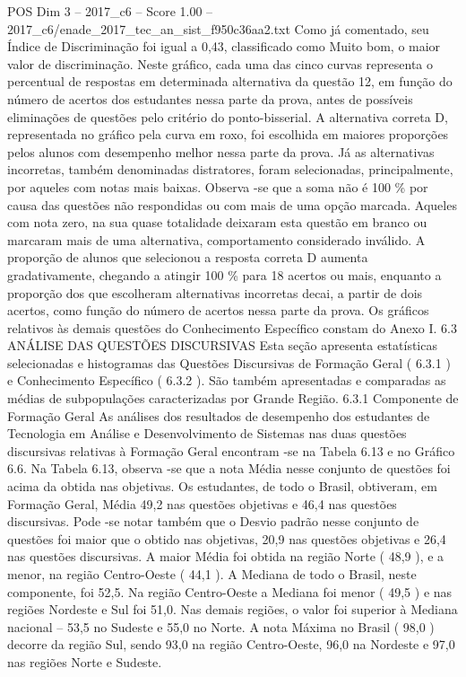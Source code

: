 \begin{textsample}{POS Dim 3 – 2017\_c6 – Score 1.00 – 2017\_c6/enade\_2017\_tec\_an\_sist\_f950c36aa2.txt}
Como já comentado, seu Índice de Discriminação foi igual a 0,43, classificado como Muito bom, o maior valor de discriminação.
Neste gráfico, cada uma das cinco curvas representa o percentual de respostas em determinada alternativa da questão 12, em função do número de acertos dos estudantes nessa parte da prova, antes de possíveis eliminações de questões pelo critério do ponto-bisserial.
A alternativa correta D, representada no gráfico pela curva em roxo, foi escolhida em maiores proporções pelos alunos com desempenho melhor nessa parte da prova.
Já as alternativas incorretas, também denominadas distratores, foram selecionadas, principalmente, por aqueles com notas mais baixas.
Observa -se que a soma não é 100 \% por causa das questões não respondidas ou com mais de uma opção marcada.
Aqueles com nota zero, na sua quase totalidade deixaram esta questão em branco ou marcaram mais de uma alternativa, comportamento considerado inválido.
A proporção de alunos que selecionou a resposta correta D aumenta gradativamente, chegando a atingir 100 \% para 18 acertos ou mais, enquanto a proporção dos que escolheram alternativas incorretas decai, a partir de dois acertos, como função do número de acertos nessa parte da prova.
Os gráficos relativos às demais questões do Conhecimento Específico constam do Anexo I. 6.3 ANÁLISE DAS QUESTÕES DISCURSIVAS Esta seção apresenta estatísticas selecionadas e histogramas das Questões Discursivas de Formação Geral ( 6.3.1 ) e Conhecimento Específico ( 6.3.2 ).
São também apresentadas e comparadas as médias de subpopulações caracterizadas por Grande Região. 6.3.1 Componente de Formação Geral As análises dos resultados de desempenho dos estudantes de Tecnologia em Análise e Desenvolvimento de Sistemas nas duas questões discursivas relativas à Formação Geral encontram -se na Tabela 6.13 e no Gráfico 6.6.
Na Tabela 6.13, observa -se que a nota Média nesse conjunto de questões foi acima da obtida nas objetivas.
Os estudantes, de todo o Brasil, obtiveram, em Formação Geral, Média 49,2 nas questões objetivas e 46,4 nas questões discursivas.
Pode -se notar também que o Desvio padrão nesse conjunto de questões foi maior que o obtido nas objetivas, 20,9 nas questões objetivas e 26,4 nas questões discursivas.
A maior Média foi obtida na região Norte ( 48,9 ), e a menor, na região Centro-Oeste ( 44,1 ).
A Mediana de todo o Brasil, neste componente, foi 52,5.
Na região Centro-Oeste a Mediana foi menor ( 49,5 ) e nas regiões Nordeste e Sul foi 51,0.
Nas demais regiões, o valor foi superior à Mediana nacional – 53,5 no Sudeste e 55,0 no Norte.
A nota Máxima no Brasil ( 98,0 ) decorre da região Sul, sendo 93,0 na região Centro-Oeste, 96,0 na Nordeste e 97,0 nas regiões Norte e Sudeste.

\end{textsample}
